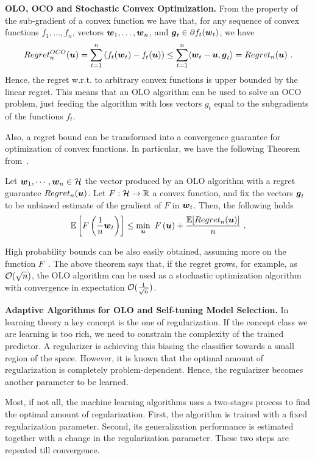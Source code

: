 \vspace{0.2cm}\noindent\textbf{\ac{OLO}, \ac{OCO} and Stochastic Convex Optimization.}
From the property of the sub-gradient of a convex function we have that, for any sequence of convex functions $f_1, \ldots, f_n$, vectors $\boldsymbol{w}_1,\ldots, \boldsymbol{w}_n$, and $\boldsymbol{g}_t \in \partial f_t(\boldsymbol{w}_t)$, we have
\[
Regret^{OCO}_n(\boldsymbol{u}) = \sum_{t=1}^n \left( f_t(\boldsymbol{w}_t) -f_t(\boldsymbol{u})\right) \leq \sum_{t=1}^n \langle \boldsymbol{w}_t-\boldsymbol{u}, \boldsymbol{g}_t\rangle = Regret_n(\boldsymbol{u})~.
\]
Hence, the regret w.r.t. to arbitrary convex functions is upper bounded by the linear regret. This means that an \ac{OLO} algorithm can be used to solve an \ac{OCO} problem, just feeding the algorithm with loss vectors $g_t$ equal to the subgradients of the functions $f_t$.

Also, a regret bound can be transformed into a convergence guarantee for optimization of convex functions.
In particular, we have the following Theorem from~\citet{Cesa-BianchiCG04}.
%
\begin{theorem}
\label{theo:online_to_batch}
Let $\boldsymbol{w}_1, \cdots, \boldsymbol{w}_n \in \mathcal{H}$ the vector produced by an OLO algorithm with a regret guarantee $Regret_n(\boldsymbol{u})$.
Let $F:\mathcal{H}\rightarrow\mathbb{R}$ a convex function, and fix the vectors $\boldsymbol{g}_t$ to be unbiased estimate of the gradient of $F$ in $\boldsymbol{w}_t$. Then, the following holds
\[
\mathbb{E}\left[F\left(\frac{1}{n} \boldsymbol{w}_t\right)\right] \leq \min_{\boldsymbol{u}} \ F\left(\boldsymbol{u}\right) + \frac{\mathbb{E}[Regret_n(\boldsymbol{u})]}{n}~.
\]
\end{theorem}

High probability bounds can be also easily obtained, assuming more on the function $F$~\citep{Cesa-BianchiCG04}.
The above theorem says that, if the regret grows, for example, as $\mathcal{O}(\sqrt{n})$, the OLO algorithm can be used as a stochastic optimization algorithm with convergence in expectation $\mathcal{O}(\frac{1}{\sqrt{n}})$.


\vspace{0.2cm}\noindent\textbf{Adaptive Algorithms for OLO and Self-tuning Model Selection.}
In learning theory a key concept is the one of regularization. If the concept class we are learning is too rich, we need to constrain the complexity of the trained predictor. A regularizer is achieving this biasing the classifier towards a small region of the space. However, it is known that the optimal amount of regularization is completely problem-dependent. Hence, the regularizer becomes another parameter to be learned.

Most, if not all, the machine learning algorithms uses a two-stages process to find the optimal amount of regularization. First, the algorithm is trained with a fixed regularization parameter. Second, its generalization performance is estimated together with a change in the regularization parameter. These two steps are repeated till convergence.

